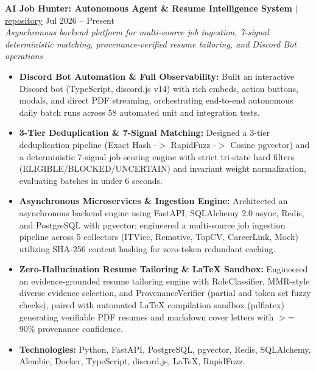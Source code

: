 \documentclass[10pt,a4paper]{article}
\begin{document}
\noindent \textbf{AI Job Hunter: Autonomous Agent \& Resume Intelligence System} $|$ \href{https://github.com/vyquochuy/Discord-Job-hunt}{repository} \hfill Jul 2026 -- Present\\
\textit{Asynchronous backend platform for multi-source job ingestion, 7-signal deterministic matching, provenance-verified resume tailoring, and Discord Bot operations}
\begin{itemize}[leftmargin=0.25in, nosep]
    \item \textbf{Discord Bot Automation \& Full Observability:} Built an interactive Discord bot (TypeScript, discord.js v14) with rich embeds, action buttons, modals, and direct PDF streaming, orchestrating end-to-end autonomous daily batch runs across 58 automated unit and integration tests.
    \item \textbf{3-Tier Deduplication \& 7-Signal Matching:} Designed a 3-tier deduplication pipeline (Exact Hash -$>$ RapidFuzz -$>$ Cosine pgvector) and a deterministic 7-signal job scoring engine with strict tri-state hard filters (ELIGIBLE/BLOCKED/UNCERTAIN) and invariant weight normalization, evaluating batches in under 6 seconds.
    \item \textbf{Asynchronous Microservices \& Ingestion Engine:} Architected an asynchronous backend engine using FastAPI, SQLAlchemy 2.0 async, Redis, and PostgreSQL with pgvector; engineered a multi-source job ingestion pipeline across 5 collectors (ITViec, Remotive, TopCV, CareerLink, Mock) utilizing SHA-256 content hashing for zero-token redundant caching.
    \item \textbf{Zero-Hallucination Resume Tailoring \& LaTeX Sandbox:} Engineered an evidence-grounded resume tailoring engine with RoleClassifier, MMR-style diverse evidence selection, and ProvenanceVerifier (partial and token set fuzzy checks), paired with automated LaTeX compilation sandbox (pdflatex) generating verifiable PDF resumes and markdown cover letters with $>$= 90\% provenance confidence.
    \item \textbf{Technologies:} Python, FastAPI, PostgreSQL, pgvector, Redis, SQLAlchemy, Alembic, Docker, TypeScript, discord.js, LaTeX, RapidFuzz.
\end{itemize}
\vspace{10pt}
\end{document}
